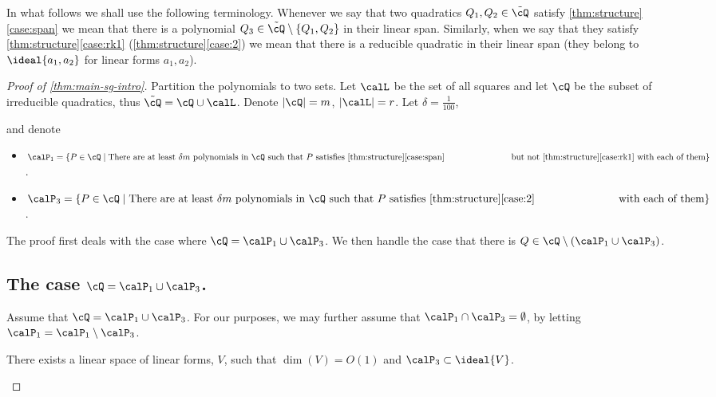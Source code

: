 In what follows we shall use the following terminology. Whenever we say that two quadratics $Q_1,Q_2\in\tilde\cQ$ satisfy \autoref{thm:structure}\ref{case:span} we mean that there is a polynomial $Q_3\in\tilde\cQ\setminus\{Q_1,Q_2\}$ in their linear span. Similarly, when we say that they satisfy \autoref{thm:structure}\ref{case:rk1}  (\autoref{thm:structure}\ref{case:2}) we mean that there is a reducible quadratic in their linear span (they belong to $\ideal{a_1,a_2}$ for linear forms $a_1,a_2$). 


\begin{proof}[Proof of \autoref{thm:main-sg-intro}]


Partition the polynomials to two sets. Let $\calL$ be the set of all squares and let $\cQ$
be the subset of irreducible quadratics, thus $\tilde{\cQ} = \cQ \cup \calL$. Denote $|\cQ| = m$, $|\calL| = r$.
Let $\delta =\frac{1}{100}$, 

and denote
\begin{itemize}

\item  $\calP_1 = \{P\in \cQ \mid \text{There are at least } \delta m \text{ polynomials in } \cQ \text { such that } P \text{ satisfies \autoref{thm:structure}\ref{case:span}} \\ \text{\hspace{2.6cm} but not \autoref{thm:structure}\ref{case:rk1} with each of them} \}$.

\item  $\calP_3 = \{P\in \cQ \mid  \text{There are at least } \delta m \text{ polynomials in } \cQ \text { such that } P \text{ satisfies \autoref{thm:structure}\ref{case:2}} \\ \text{\hspace{2.6cm} 
 with each of them} \}$.
\end{itemize}
The proof first deals with the case where $\cQ = \calP_1\cup \calP_3$. We then handle the case that there is $Q \in \cQ \setminus(\calP_1\cup \calP_3)$.


\subsection{The case $\cQ=\calP_1\cup\calP_3$.}

Assume that $\cQ = \calP_1\cup \calP_3$. For our purposes, we may further assume that $\calP_1\cap \calP_3 = \emptyset$, by letting $\calP_1 = \calP_1 \setminus \calP_3$.

\begin{claim}\label{cla:VforP3}
There exists a linear space of linear forms, $V$, such that $\dim(V)=O(1)$ and $\calP_3 \subset \ideal{V}$.
\end{claim}


\end{proof}
